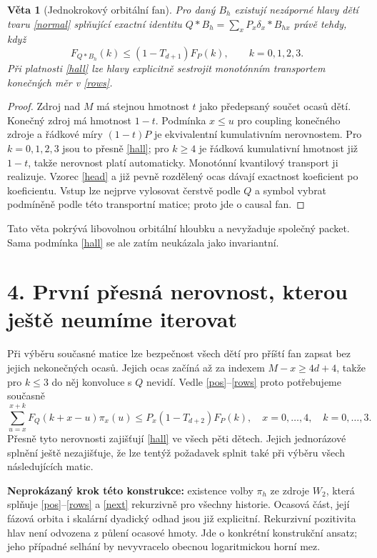 \documentclass[11pt,a4paper]{article}
\newtheorem{theorem}{Věta}
\begin{document}
\begin{theorem}[Jednokrokový orbitální fan]\label{fan}
Pro daný $B_h$ existují nezáporné hlavy dětí tvaru \eqref{normal}
splňující exactní identitu
$Q*B_h=\sum_xP_x\delta_x*B_{hx}$ právě tehdy, když
\begin{equation}\label{hall}
 \boxed{F_{Q*B_h}(k)\le(1-T_{d+1})F_P(k),\qquad k=0,1,2,3.}
\end{equation}
Při platnosti \eqref{hall} lze hlavy explicitně sestrojit monotónním
transportem konečných měr v \eqref{rows}.
\end{theorem}
\begin{proof}
Zdroj nad $M$ má stejnou hmotnost $t$ jako předepsaný součet ocasů dětí.
Konečný zdroj má hmotnost $1-t$. Podmínka $x\le u$ pro coupling konečného
zdroje a řádkové míry $(1-t)P$ je ekvivalentní kumulativním nerovnostem.
Pro $k=0,1,2,3$ jsou to přesně \eqref{hall}; pro $k\ge4$ je řádková
kumulativní hmotnost již $1-t$, takže nerovnost platí automaticky.
Monotónní kvantilový transport ji realizuje. Vzorec \eqref{head}
a již pevně rozdělený ocas dávají exactnost koeficient po koeficientu.
Vstup lze nejprve vylosovat čerstvě podle $Q$ a symbol vybrat podmíněně
podle této transportní matice; proto jde o causal fan.
\end{proof}

Tato věta pokrývá libovolnou orbitální hloubku a nevyžaduje společný
packet. Sama podmínka \eqref{hall} se ale zatím neukázala jako invariantní.

\section*{4. První přesná nerovnost, kterou ještě neumíme iterovat}
Při výběru současné matice lze bezpečnost všech dětí pro příští fan
zapsat bez jejich nekonečných ocasů. Jejich ocas začíná až za indexem
$M-x\ge4d+4$, takže pro $k\le3$ do něj konvoluce s $Q$ nevidí.
Vedle \eqref{pos}--\eqref{rows} proto potřebujeme současně
\begin{equation}\label{next}
 \boxed{
 \sum_{u=x}^{x+k}F_Q(k+x-u)\pi_x(u)
 \le P_x(1-T_{d+2})F_P(k),
 \quad x=0,\ldots,4,\quad k=0,\ldots,3.}
\end{equation}
Přesně tyto nerovnosti zajišťují \eqref{hall} ve všech pěti dětech.
Jejich jednorázové splnění ještě nezajišťuje, že lze tentýž požadavek
splnit také při výběru všech následujících matic.

\noindent\textbf{Neprokázaný krok této konstrukce:}
existence volby $\pi_h$ ze zdroje $W_2$, která splňuje
\eqref{pos}--\eqref{rows} a \eqref{next} rekurzivně pro všechny historie.
Ocasová část, její fázová orbita i skalární dyadický odhad jsou již
explicitní. Rekurzivní pozitivita hlav není odvozena z půlení ocasové hmoty.
Jde o konkrétní konstrukční ansatz; jeho případné selhání by nevyvracelo
obecnou logaritmickou horní mez.
\end{document}
